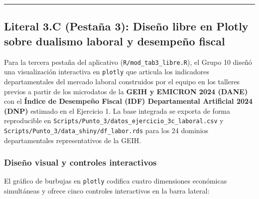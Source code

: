 \documentclass[
  10pt,
  letterpaper,
  DIV=11,
  numbers=noendperiod]{scrartcl}
\begin{document}
\begin{center}\rule{0.5\linewidth}{0.5pt}\end{center}

\subsection{Literal 3.C (Pestaña 3): Diseño libre en Plotly sobre
dualismo laboral y desempeño
fiscal}\label{literal-3.c-pestauxf1a-3-diseuxf1o-libre-en-plotly-sobre-dualismo-laboral-y-desempeuxf1o-fiscal}

Para la tercera pestaña del aplicativo (\texttt{R/mod\_tab3\_libre.R}),
el Grupo 10 diseñó una visualización interactiva en \texttt{plotly} que
articula los indicadores departamentales del mercado laboral construidos
por el equipo en los talleres previos a partir de los microdatos de la
\textbf{GEIH y EMICRON 2024 (DANE)} con el \textbf{Índice de Desempeño
Fiscal (IDF) Departamental Artificial 2024 (DNP)} estimado en el
Ejercicio 1. La base integrada se exporta de forma reproducible en
\texttt{Scripts/Punto\_3/datos\_ejercicio\_3c\_laboral.csv} y
\texttt{Scripts/Punto\_3/data\_shiny/df\_labor.rds} para los 24 dominios
departamentales representativos de la GEIH.

\subsubsection{Diseño visual y controles
interactivos}\label{diseuxf1o-visual-y-controles-interactivos}

El gráfico de burbujas en \texttt{plotly} codifica cuatro dimensiones
económicas simultáneas y ofrece cinco controles interactivos en la barra
lateral:
\end{document}
